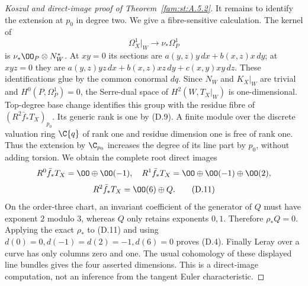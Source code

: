 \begin{proof}[Koszul and direct-image proof of Theorem~\ref{fam:st:A.5.2}]
It remains to identify the extension at $p_0$ in degree two. We give
a fibre-sensitive calculation. The kernel of
\[
 \Omega_X^1|_W\longrightarrow\nu_*\Omega_P^1
\]
is $\nu_*\OO_P\otimes N_W^*$. At $xy=0$ its sections are
$a(y,z)y\,dx+b(x,z)x\,dy$; at $xyz=0$ they are
$a(y,z)yz\,dx+b(x,z)xz\,dy+c(x,y)xy\,dz$.
These identifications glue by the common conormal $dq$.
Since $N_W$ and $K_X|_W$ are trivial and $H^0(P,\Omega_P^1)=0$, the
Serre-dual space of $H^2(W,T_X|_W)$ is one-dimensional.
Top-degree base change identifies this group with the residue fibre
of $(R^2\bar f_*T_X)_{p_0}$. Its generic rank is one by (D.9).
A finite module over the discrete valuation ring $\C\{q\}$ of rank
one and residue dimension one is free of rank one. Thus the extension
by $\C_{p_0}$ increases the degree of its line part by $p_0$, without
adding torsion. We obtain the complete root direct images
\[
 R^0\bar f_*T_X=\OO\oplus\OO(-1),\quad
 R^1\bar f_*T_X=\OO\oplus\OO(-1)\oplus\OO(2),
\]
\[
 R^2\bar f_*T_X=\OO(6)\oplus Q.                       \tag{D.11}
\]
On the order-three chart, an invariant coefficient of the generator
of $Q$ must have exponent $2$ modulo $3$, whereas $Q$ only retains
exponents $0,1$. Therefore $\rho_*Q=0$. Applying the exact $\rho_*$
to (D.11) and using
$d(0)=0,d(-1)=d(2)=-1,d(6)=0$ proves (D.4).
Finally Leray over a curve has only columns zero and one. The usual
cohomology of these displayed line bundles gives the four asserted
dimensions. This is a direct-image computation, not an inference from
the tangent Euler characteristic.
\end{proof}

